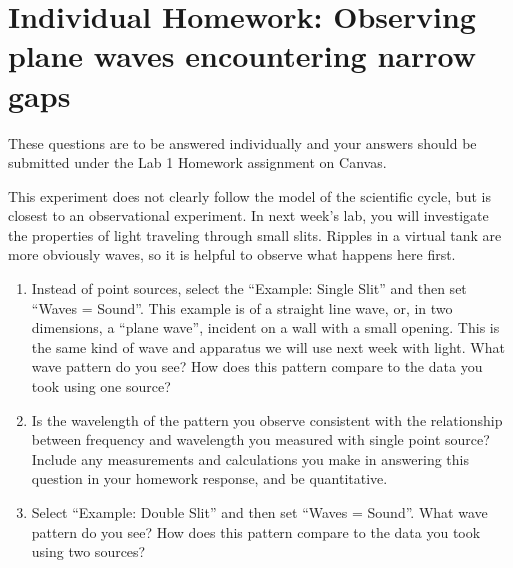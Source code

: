 \section{Individual Homework: Observing plane waves encountering narrow gaps}

These questions are to be answered individually and your answers should be submitted under the Lab 1 Homework assignment on Canvas.

This experiment does not clearly follow the model of the scientific cycle, but is closest to an observational experiment. In next week's lab, you will investigate the properties of light traveling through small slits. Ripples in a virtual tank are more obviously waves, so it is helpful to observe what happens here first.

\begin{enumerate}
	\item Instead of point sources, select the ``Example: Single Slit'' and then set ``Waves = Sound''. This example is of a straight line wave, or, in two dimensions, a ``plane wave'', incident on a wall with a small opening. This is the same kind of wave and apparatus we will use next week with light. What wave pattern do you see? How does this pattern compare to the data you took using one source?
	
	\item Is the wavelength of the pattern you observe consistent with the relationship between frequency and wavelength you
	measured with single point source? Include any measurements and calculations you make in answering this question in your homework response, and be quantitative.
	
	\item Select ``Example: Double Slit'' and then set ``Waves = Sound''. What wave pattern do you see? How does this pattern compare to the data you took using two sources?
	
\end{enumerate}
	


	

